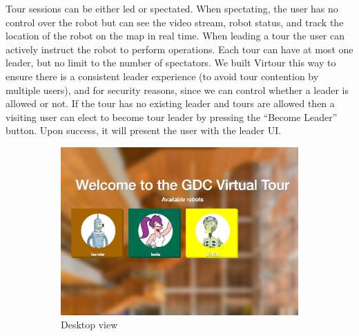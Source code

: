 \documentclass[
  oneside,
  11pt, a4paper,
  footinclude=true,
  headinclude=true,
  cleardoublepage=empty
]{article}
\begin{document}
Tour sessions can be either led or spectated. When spectating, the user has no
control over the robot but can see the video stream, robot status, and track
the location of the robot on the map in real time. When leading a tour the user
can actively instruct the robot to perform operations. Each tour can have at
most one leader, but no limit to the number of spectators. We built Virtour
this way to ensure there is a consistent leader experience (to avoid tour
contention by multiple users), and for security reasons, since we can control
whether a leader is allowed or not. If the tour has no existing leader and
tours are allowed then a visiting user can elect to become tour leader by
pressing the ``Become Leader'' button. Upon success, it will present the user
with the leader UI.

\begin{figure}[!tbp]
  \begin{subfigure}[b]{0.63\textwidth}
    \includegraphics[width=\textwidth]{tour_homepage}
    \caption{Desktop view}
  \end{subfigure}
  \hfill
  \begin{subfigure}[b]{0.25\textwidth}

\end{subfigure}
\end{figure}
\end{document}
